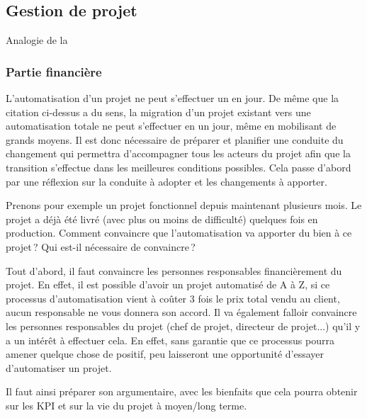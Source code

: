 \subsection{Gestion de projet}

\epigraph{}{Analogie de la }

\subsubsection{Partie financière}
L'automatisation d'un projet ne peut s'effectuer un en jour. De même que la citation ci-dessus a du sens, la migration d'un projet existant vers une automatisation totale ne peut s'effectuer en un jour, même en mobilisant de grands moyens. Il est donc nécessaire de préparer et planifier une conduite du changement qui permettra d'accompagner tous les acteurs du projet afin que la transition s'effectue dans les meilleures conditions possibles. Cela passe d'abord par une réflexion sur la conduite à adopter et les changements à apporter. 

Prenons pour exemple un projet fonctionnel depuis maintenant plusieurs mois. Le projet a déjà été livré (avec plus ou moins de difficulté) quelques fois en production. Comment convaincre que l'automatisation va apporter du bien à ce projet ? Qui est-il nécessaire de convaincre ?

Tout d'abord, il faut convaincre les personnes responsables financièrement du projet. En effet, il est possible d'avoir un projet automatisé de A à Z, si ce processus d'automatisation vient à coûter 3 fois le prix total vendu au client, aucun responsable ne vous donnera son accord. Il va également falloir convaincre les personnes responsables du projet (chef de projet, directeur de projet...) qu'il y a un intérêt à effectuer cela. En effet, sans garantie que ce processus pourra amener quelque chose de positif, peu laisseront une opportunité d'essayer d'automatiser un projet.

Il faut ainsi préparer son argumentaire, avec les bienfaits que cela pourra obtenir sur les \gls{KPI} et sur la vie du projet à moyen/long terme.

